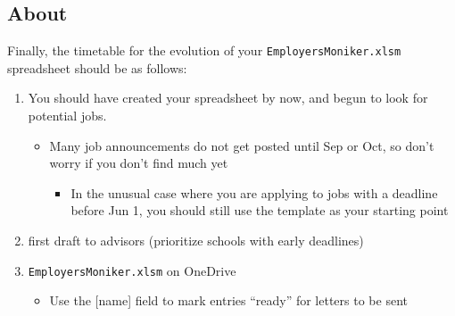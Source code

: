\documentclass{\classes/econtex}
\begin{document}
  \hypertarget{about-employersmoniker}{}
  \subsection*{About \EMW}

  Finally, the timetable for the evolution of your \texttt{EmployersMoniker.xlsm} spreadsheet should be as follows:
\hypertarget{employers-list-timetable}{}  
\begin{enumerate}
\item[Jun-1] You should have created your {\EMW} spreadsheet by now, and begun to look for potential jobs.
  \begin{itemize}
  \item Many job announcements do not get posted until Sep or Oct, so don't worry if you don't find much yet
  \begin{itemize}
  \item In the unusual case where you are applying to jobs with a deadline before Jun 1, you should still use the {\Employers} template as your starting point
  \end{itemize}
  \end{itemize}
\item[Sep-1] first draft to advisors (prioritize schools with early deadlines)
\item[Oct-1] \texttt{EmployersMoniker.xlsm} on OneDrive
  \begin{itemize}
  \item Use the [name] field to mark entries ``ready'' for letters to be sent
  \end{itemize} 
\end{enumerate}


\pagebreak
\end{document}
